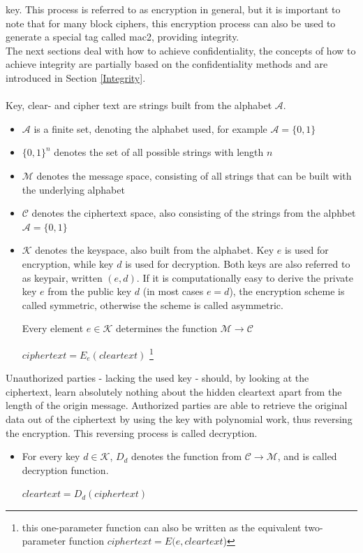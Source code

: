 key. This process is referred to as encryption in general, but it is important to note that for many block ciphers, this encryption process
can also be used to generate a special tag called \gls{mac2}, providing integrity.
\\
The next sections deal with how to achieve confidentiality, the 
concepts of how to achieve integrity are partially based on the confidentiality methods and are introduced in Section \ref{Integrity}.
\\
\\
Key, clear- and cipher text are strings built from the alphabet $\mathcal{A}$. 
\begin{itemize}
 \item $\mathcal{A}$ is a finite set, denoting the alphabet used, for example
 $\mathcal{A} = \{0, 1\}$
 \item $\{0, 1\}^n$ denotes the set of all possible strings with length $n$
 \item $\mathcal{M}$ denotes the message space, consisting of all strings that can be built with the 
 underlying alphabet
 \item $\mathcal{C}$ denotes the ciphertext space, also consisting of the strings from 
 the alphbet
$\mathcal{A} = \{0, 1\}$
\item $\mathcal{K}$ denotes the keyspace, also built from the alphabet. Key $e$ is used for encryption, while key $d$ is used for decryption.
Both keys are also referred to as keypair, written $(e,d)$. 
If it is computationally easy to derive the private key $e$ from the public key $d$ (in most cases $e = d$), the encryption scheme
is called symmetric, otherwise the scheme is called asymmetric.

Every element $e \in \mathcal{K}$ determines the function $\mathcal{M} \rightarrow \mathcal{C}$
  \begin{center}
 $ciphertext = E_e(cleartext)$ \footnote{this one-parameter function can also be written as the equivalent two-parameter function $ciphertext=E(e,cleartext$)}
  \end{center}
\end{itemize}
Unauthorized parties - lacking the used key - should, by looking at the ciphertext, learn
absolutely nothing about the hidden cleartext apart from the length of the origin message. Authorized parties are
able to retrieve the original data out of the ciphertext by using the key with polynomial work, thus reversing
the encryption. This reversing process is called decryption.
\begin{itemize}
 \item For every key $d \in \mathcal{K}$, $D_d$ denotes the function from $\mathcal{C} \rightarrow
  \mathcal{M}$, and is called decryption function.
  \begin{center}
  $cleartext  = D_d(ciphertext)$
    \end{center}
\end{itemize}
